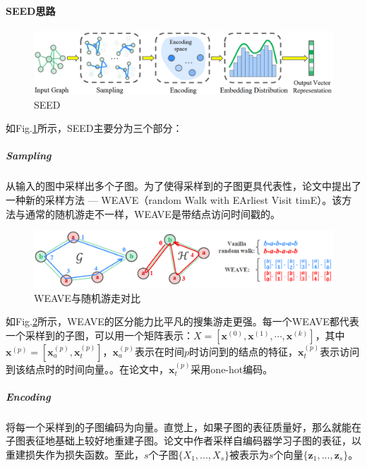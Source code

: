 \paragraph{SEED思路}
\begin{figure}[h]
	\centering
	\includegraphics[width=.8\textwidth]{pics/SEED.png}
	\caption{SEED}
	\label{fig:seed}
\end{figure}
如Fig.\ref{fig:seed}所示，SEED主要分为三个部分：
\subparagraph{Sampling}
从输入的图中采样出多个子图。为了使得采样到的子图更具代表性，论文中提出了一种新的采样方法 --- WEAVE（random Walk with EArliest Visit timE）。该方法与通常的随机游走不一样，WEAVE是带结点访问时间戳的。
\begin{figure}[h]
	\centering
	\includegraphics[width=.8\textwidth]{pics/WEAVE.png}
	\caption{WEAVE与随机游走对比}
	\label{fig:weave}
\end{figure}
如Fig.\ref{fig:weave}所示，WEAVE的区分能力比平凡的搜集游走更强。每一个WEAVE都代表一个采样到的子图，可以用一个矩阵表示：$X=\left[\mathbf{x}^{(0)}, \mathbf{x}^{(1)}, \cdots, \mathbf{x}^{(k)}\right]$，其中$\mathbf{x}^{(p)} = [\mathbf{x}_a^{(p)}, \mathbf{x}_t^{(p)}]$，$\mathbf{x}_a^{(p)}$表示在时间$p$时访问到的结点的特征，$\mathbf{x}_t^{(p)}$表示访问到该结点时的时间向量。。在论文中，$\mathbf{x}_t^{(p)}$采用one-hot编码。

\subparagraph{Encoding}
将每一个采样到的子图编码为向量。直觉上，如果子图的表征质量好，那么就能在子图表征地基础上较好地重建子图。论文中作者采样自编码器学习子图的表征，以重建损失作为损失函数。至此，$s$个子图$\{X_1, ..., X_s\}$被表示为$s$个向量$\{\mathbf{z}_1, ..., \mathbf{z}_s\}$。


